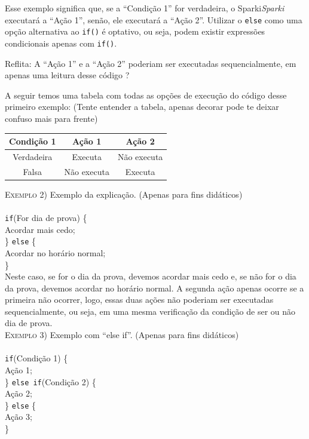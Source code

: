     Esse exemplo significa que, se a ``Condição 1'' for verdadeira, o Sparki\textsl{Sparki} executará a ``Ação 1'', senão, ele executará a ``Ação 2''. Utilizar o \texttt{else} como uma opção alternativa ao \texttt{if()} é optativo, ou seja, podem existir expressões condicionais apenas com \texttt{if()}.
    
    \begin{center}
    {\large{Reflita}}: A ``Ação 1'' e a ``Ação 2'' poderiam ser executadas sequencialmente, em apenas uma leitura desse código ?
    \end{center}
    
    A seguir temos uma tabela com todas as opções de execução do código desse primeiro exemplo: (Tente entender a tabela, apenas decorar pode te deixar confuso mais para frente)
    
    \begin{center}
    \begin{tabular}{|c|c|c|}
    \hline
    Condição 1 & Ação 1 & Ação 2 \\ \hline
    Verdadeira & Executa & Não executa \\ \hline
    Falsa & Não executa & Executa \\ \hline
    \end{tabular}
    \end{center}
    
    \textsc{Exemplo 2)} Exemplo da explicação. (Apenas para fins didáticos)
    \\
    \\
    \noindent \texttt{if}(For dia de prova) \{\\
    \indent Acordar mais cedo;\\
    \} \texttt{else} \{\\
    \indent Acordar no horário normal;\\
    \}\\
    
    Neste caso, se for o dia da prova, devemos acordar mais cedo e, se não for o dia da prova, devemos acordar no horário normal. A segunda ação apenas ocorre se a primeira não ocorrer, logo, essas duas ações não poderiam ser executadas sequencialmente, ou seja, em uma mesma verificação da condição de ser ou não dia de prova.\\
    
    \textsc{Exemplo 3)} Exemplo com ``else if''. (Apenas para fins didáticos)
    \\
    \\
    \noindent \texttt{if}(Condição 1) \{\\
    \indent Ação 1;\\
    \} \texttt{else if}(Condição 2) \{ \\
    \indent Ação 2;\\
    \} \texttt{else} \{\\
    \indent Ação 3;\\
    \}\\
    

